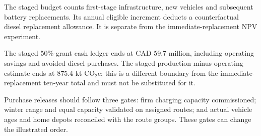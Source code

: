 The staged budget counts first-stage infrastructure, new vehicles and subsequent battery replacements. Its annual eligible increment deducts a counterfactual diesel replacement allowance. It is separate from the immediate-replacement NPV experiment.


The staged 50\%-grant cash ledger ends at CAD 59.7 million, including operating savings and avoided diesel purchases. The staged production-minus-operating estimate ends at 875.4 kt CO$_2$e; this is a different boundary from the immediate-replacement ten-year total and must not be substituted for it.


Purchase releases should follow three gates: firm charging capacity commissioned; winter range and equal capacity validated on assigned routes; and actual vehicle ages and home depots reconciled with the route groups. These gates can change the illustrated order.

